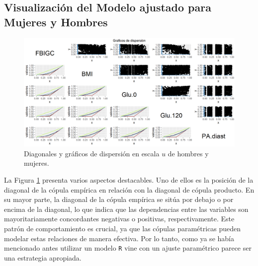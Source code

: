 



\begin{landscape}

\subsection{Visualización del Modelo ajustado para Mujeres y Hombres}
\begin{figure}[H]
    \centering
    \includegraphics[height = 13.5 cm, width = 1.4 \textwidth]{4img/UdiagT.png}
    \caption{Diagonales y gráficos de dispersión en escala $u$ de hombres y mujeres.}
    \label{fig:diagTot}
\end{figure}

\end{landscape}

La Figura \ref{fig:diagTot} presenta varios aspectos destacables. Uno de ellos es la posición de la diagonal de la cópula empírica en relación con la diagonal de cópula producto. En su mayor parte, la diagonal de la cópula empírica se sitúa por debajo o por encima de la diagonal, lo que indica que las dependencias entre las variables son mayoritariamente concordantes negativas o positivas, respectivamente. Este patrón de comportamiento es crucial, ya que las cópulas paramétricas pueden modelar estas relaciones de manera efectiva. Por lo tanto, como ya se había mencionado antes utilizar un modelo \texttt{R} vine con un ajuste paramétrico parece ser una estrategia apropiada.

